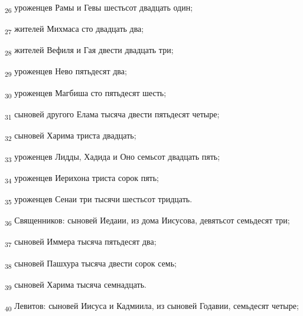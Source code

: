 \begin{tcolorbox}
\textsubscript{26} уроженцев Рамы и Гевы шестьсот двадцать один;
\end{tcolorbox}
\begin{tcolorbox}
\textsubscript{27} жителей Михмаса сто двадцать два;
\end{tcolorbox}
\begin{tcolorbox}
\textsubscript{28} жителей Вефиля и Гая двести двадцать три;
\end{tcolorbox}
\begin{tcolorbox}
\textsubscript{29} уроженцев Нево пятьдесят два;
\end{tcolorbox}
\begin{tcolorbox}
\textsubscript{30} уроженцев Магбиша сто пятьдесят шесть;
\end{tcolorbox}
\begin{tcolorbox}
\textsubscript{31} сыновей другого Елама тысяча двести пятьдесят четыре;
\end{tcolorbox}
\begin{tcolorbox}
\textsubscript{32} сыновей Харима триста двадцать;
\end{tcolorbox}
\begin{tcolorbox}
\textsubscript{33} уроженцев Лидды, Хадида и Оно семьсот двадцать пять;
\end{tcolorbox}
\begin{tcolorbox}
\textsubscript{34} уроженцев Иерихона триста сорок пять;
\end{tcolorbox}
\begin{tcolorbox}
\textsubscript{35} уроженцев Сенаи три тысячи шестьсот тридцать.
\end{tcolorbox}
\begin{tcolorbox}
\textsubscript{36} Священников: сыновей Иедаии, из дома Иисусова, девятьсот семьдесят три;
\end{tcolorbox}
\begin{tcolorbox}
\textsubscript{37} сыновей Иммера тысяча пятьдесят два;
\end{tcolorbox}
\begin{tcolorbox}
\textsubscript{38} сыновей Пашхура тысяча двести сорок семь;
\end{tcolorbox}
\begin{tcolorbox}
\textsubscript{39} сыновей Харима тысяча семнадцать.
\end{tcolorbox}
\begin{tcolorbox}
\textsubscript{40} Левитов: сыновей Иисуса и Кадмиила, из сыновей Годавии, семьдесят четыре;
\end{tcolorbox}
